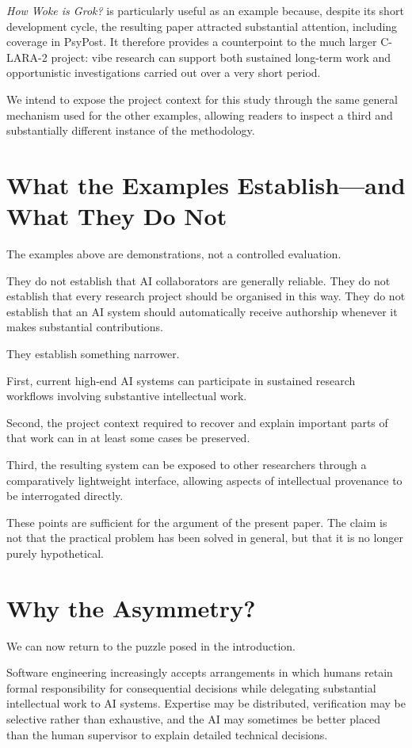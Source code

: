 \emph{How Woke is Grok?} is particularly useful as an example because, despite its short development cycle, the resulting paper attracted substantial attention, including coverage in PsyPost. It therefore provides a counterpoint to the much larger C-LARA-2 project: vibe research can support both sustained long-term work and opportunistic investigations carried out over a very short period.

We intend to expose the project context for this study through the same general mechanism used for the other examples, allowing readers to inspect a third and substantially different instance of the methodology.


\section{What the Examples Establish---and What They Do Not}

The examples above are demonstrations, not a controlled evaluation.

They do not establish that AI collaborators are generally reliable. They do not establish that every research project should be organised in this way. They do not establish that an AI system should automatically receive authorship whenever it makes substantial contributions.

They establish something narrower.

First, current high-end AI systems can participate in sustained research workflows involving substantive intellectual work.

Second, the project context required to recover and explain important parts of that work can in at least some cases be preserved.

Third, the resulting system can be exposed to other researchers through a comparatively lightweight interface, allowing aspects of intellectual provenance to be interrogated directly.

These points are sufficient for the argument of the present paper. The claim is not that the practical problem has been solved in general, but that it is no longer purely hypothetical.


\section{Why the Asymmetry?}

We can now return to the puzzle posed in the introduction.

Software engineering increasingly accepts arrangements in which humans retain formal responsibility for consequential decisions while delegating substantial intellectual work to AI systems. Expertise may be distributed, verification may be selective rather than exhaustive, and the AI may sometimes be better placed than the human supervisor to explain detailed technical decisions.

